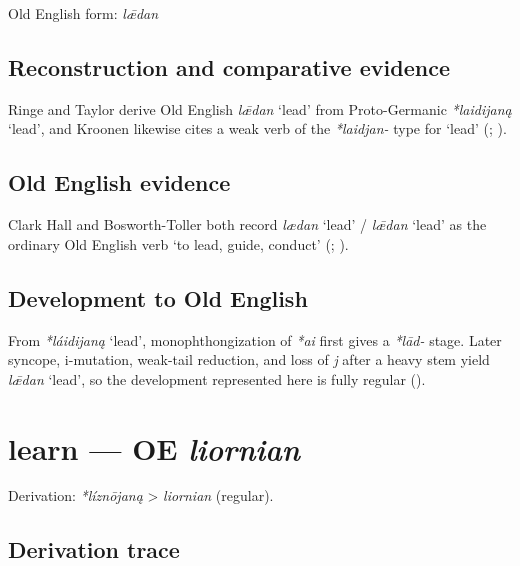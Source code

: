 \documentclass[
  british,
  a4paper,
  openany]{book}
\providecommand{\Recon}[1]{\emph{*#1}}
{\catcode`→=\active \global\def→{\ensuremath{\rightarrow}}}
\providecommand{\texorpdfstring}[2]{#1}
\providecommand{\Recon}[1]{\emph{*#1}}
{\catcode`→=\active \global\def→{\ensuremath{\rightarrow}}}
\begin{document}
Old English form: \emph{lǣdan}

\subsection{Reconstruction and comparative
evidence}\label{reconstruction-and-comparative-evidence-33}

Ringe and Taylor derive Old English \emph{lǣdan} `lead' from
Proto-Germanic \Recon{laidijaną} `lead', and Kroonen likewise cites a
weak verb of the \emph{*laidjan-} type for `lead'
(;
).

\subsection{Old English evidence}\label{old-english-evidence-33}

Clark Hall and Bosworth-Toller both record \emph{lædan} `lead' /
\emph{lǣdan} `lead' as the ordinary Old English verb `to lead, guide,
conduct' (;
).

\subsection{Development to Old
English}\label{development-to-old-english-33}

From \Recon{láidijaną} `lead', monophthongization of \emph{*ai} first
gives a \emph{*lād-} stage. Later syncope, i-mutation, weak-tail
reduction, and loss of \emph{j} after a heavy stem yield \emph{lǣdan}
`lead', so the development represented here is fully regular
().

\section{\texorpdfstring{learn --- OE
\emph{liornian}}{learn --- OE liornian}}\label{learn-oe-liornian}


Derivation: \emph{*líznōjaną} \textgreater{} \emph{liornian} (regular).

\subsection{Derivation trace}\label{derivation-trace-34}
\end{document}

